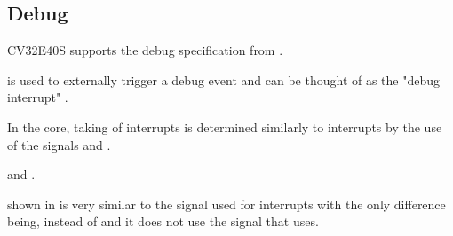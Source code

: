 



\subsection{Debug}

CV32E40S supports the debug specification from \cite{pauldonahueRISCVDebugSupport2023} \cite{openhwgroupDebugTriggerCOREV2023}.

 is used to externally trigger a debug event and can be thought of as the "debug interrupt" \cite{openhwgroupDebugTriggerCOREV2023}.

In the core, taking of interrupts is determined similarly to interrupts by the use of the signals  and .

 and .

 shown in  is very similar to the  signal used for interrupts with the only difference being,  instead of  and it does not use the  signal that  uses\cite{OpenhwgroupCv32e40s2024}. 

